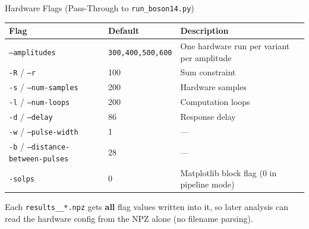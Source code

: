 \documentclass[aspectratio=169]{beamer}
\begin{document}

\begin{frame}[fragile]{Hardware Flags (Pass-Through to \texttt{run\_boson14.py})}
    \begin{table}
    \footnotesize
    \begin{tabular}{l l l}
        \toprule
        \textbf{Flag} & \textbf{Default} & \textbf{Description} \\
        \midrule
        \texttt{--amplitudes} & \texttt{300,400,500,600} & One hardware run per variant per amplitude \\
        \texttt{-R} / \texttt{--r} & 100  & Sum constraint \\
        \texttt{-s} / \texttt{--num-samples} & 200 & Hardware samples \\
        \texttt{-l} / \texttt{--num-loops} & 200 & Computation loops \\
        \texttt{-d} / \texttt{--delay} & 86 & Response delay \\
        \texttt{-w} / \texttt{--pulse-width} & 1 & --- \\
        \texttt{-b} / \texttt{--distance-between-pulses} & 28 & --- \\
        \texttt{-solps} & 0 & Matplotlib block flag (0 in pipeline mode) \\
        \bottomrule
    \end{tabular}
    \end{table}

    \vspace{0.5em}
    Each \texttt{results\_\_*.npz} gets \textbf{all} flag values written into it, so later analysis can read the hardware config from the NPZ alone (no filename parsing).
\end{frame}

\end{document}
